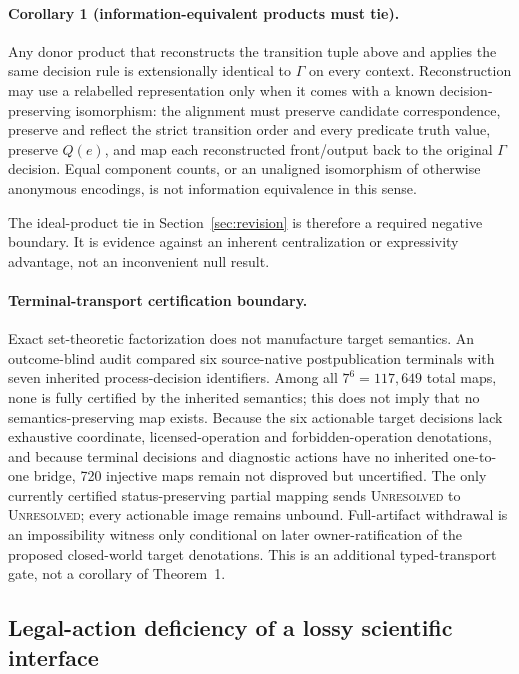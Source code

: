 \paragraph{Corollary 1 (information-equivalent products must tie).}
Any donor product that reconstructs the transition tuple above and applies the
same decision rule is extensionally identical to $\Gamma$ on every context.
Reconstruction may use a relabelled representation only when it comes with a
known decision-preserving isomorphism: the alignment must preserve candidate
correspondence, preserve and reflect the strict transition order and every
predicate truth value, preserve $Q(e)$, and map each reconstructed front/output
back to the original $\Gamma$ decision. Equal component counts, or an unaligned
isomorphism of otherwise anonymous encodings, is not information equivalence in
this sense.

The ideal-product tie in Section~\ref{sec:revision} is therefore a required
negative boundary. It is evidence against an inherent centralization or
expressivity advantage, not an inconvenient null result.

\paragraph{Terminal-transport certification boundary.}
Exact set-theoretic factorization does not manufacture target semantics. An
outcome-blind audit compared six source-native postpublication terminals with
seven inherited process-decision identifiers. Among all
$7^6=117{,}649$ total maps, none is fully certified by the inherited semantics;
this does not imply that no semantics-preserving map exists. Because the six
actionable target decisions lack exhaustive coordinate, licensed-operation and
forbidden-operation denotations, and because terminal decisions and diagnostic
actions have no inherited one-to-one bridge, 720 injective maps remain not
disproved but uncertified. The only currently certified status-preserving
partial mapping sends \textsc{Unresolved} to \textsc{Unresolved}; every
actionable image remains unbound. Full-artifact withdrawal is an impossibility
witness only conditional on later owner-ratification of the proposed
closed-world target denotations. This is an additional typed-transport gate,
not a corollary of Theorem~1.

\subsection{Legal-action deficiency of a lossy scientific interface}

